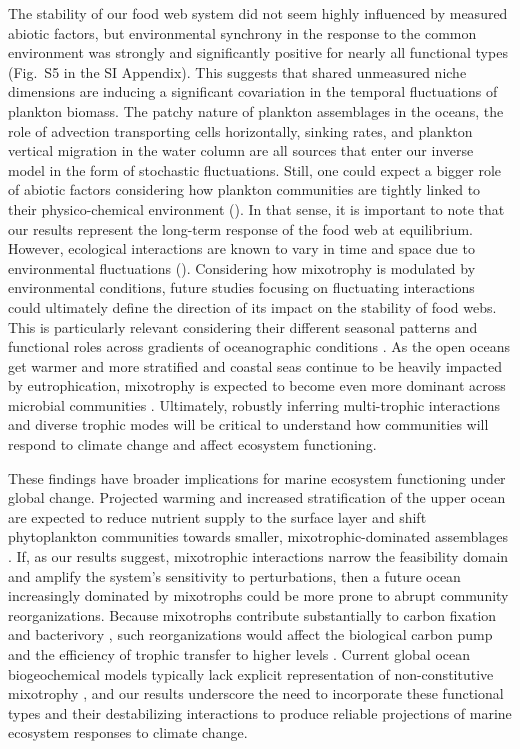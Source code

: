\documentclass[12pt]{article}
\begin{document}
The stability of our food web system did not seem highly influenced by measured abiotic factors, but environmental synchrony in the response to the common environment was strongly and significantly positive for nearly all functional types (Fig.~S5 in the SI Appendix). This suggests that shared unmeasured niche dimensions are inducing a significant covariation in the temporal fluctuations of plankton biomass. The patchy nature of plankton assemblages in the oceans, the role of advection transporting cells horizontally, sinking rates, and plankton vertical migration in the water column are all sources that enter our inverse model in the form of stochastic fluctuations. Still, one could expect a bigger role of abiotic factors considering how plankton communities are tightly linked to their physico-chemical environment (\citealp{Reynolds2006,Sommer2011a}). In that sense, it is important to note that our results represent the long-term response of the food web at equilibrium. However, ecological interactions are known to vary in time and space due to environmental fluctuations (\citealp{Deyle2016,Cenci2019b,Kortsch2019}). Considering how mixotrophy is modulated by environmental conditions, future studies focusing on fluctuating interactions could ultimately define the direction of its impact on the stability of food webs. This is particularly relevant considering their different seasonal patterns and functional roles across gradients of oceanographic conditions \citep{leles2021differences}. As the open oceans get warmer and more stratified and coastal seas continue to be heavily impacted by eutrophication, mixotrophy is expected to become even more dominant across microbial communities \citep{Burkholder2008,Stoecker2016}. Ultimately, robustly inferring multi-trophic interactions and diverse trophic modes will be critical to understand how communities will respond to climate change and affect ecosystem functioning.

These findings have broader implications for marine ecosystem functioning under global change. Projected warming and increased stratification of the upper ocean are expected to reduce nutrient supply to the surface layer and shift phytoplankton communities towards smaller, mixotrophic-dominated assemblages \citep{Kwiatkowski2020}. If, as our results suggest, mixotrophic interactions narrow the feasibility domain and amplify the system's sensitivity to perturbations, then a future ocean increasingly dominated by mixotrophs could be more prone to abrupt community reorganizations. Because mixotrophs contribute substantially to carbon fixation and bacterivory \citep{Ward2016}, such reorganizations would affect the biological carbon pump and the efficiency of trophic transfer to higher levels \citep{Lotze2019}. Current global ocean biogeochemical models typically lack explicit representation of non-constitutive mixotrophy \citep{Flynn2019}, and our results underscore the need to incorporate these functional types and their destabilizing interactions to produce reliable projections of marine ecosystem responses to climate change.
\end{document}
